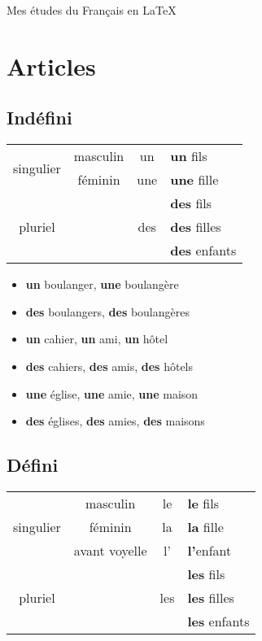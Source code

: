 \documentclass[12pt]{article}  %
\begin{document}
 

\newcommand{\bo}[1]{\textbf{#1}}
\newcommand{\rarrow}{\begin{math}\to\ \end{math}}


{\LARGE Mes études du Français en \LaTeX}

\section{Articles} 

\subsection{Indéfini}

\begin{tabular}{| c | c | c | l |}
  \hline                       
  \multirow{2}{*}{singulier} 
  	& masculin      & un & \bo{un} fils  \\ \cline{2-4}
  	& féminin       & une & \bo{une} fille \\ \cline{2-4}
  \multirow{3}{*}{pluriel} 
  	& & \multirow{3}{*}{des} & \bo{des} fils \\ \cline{4-4}
    & &  & \bo{des} filles \\ \cline{4-4}
    & &  & \bo{des} enfants \\
  \hline  
\end{tabular}

\begin{itemize}
  \item \bo{un} boulanger, \bo{une} boulangère 
  \item \bo{des} boulangers, \bo{des} boulangères
  \item \bo{un} cahier, \bo{un} ami, \bo{un} hôtel
  \item \bo{des} cahiers, \bo{des} amis, \bo{des} hôtels
  \item \bo{une} église, \bo{une} amie, \bo{une} maison
  \item \bo{des} églises, \bo{des} amies, \bo{des} maisons
\end{itemize}

\subsection{Défini}

\begin{tabular}{| c | c | c | l |}
  \hline                       
  \multirow{3}{*}{singulier} 
  	& masculin      & le & \bo{le} fils  \\ \cline{2-4}
  	& féminin       & la & \bo{la} fille \\ \cline{2-4}
  	& avant voyelle & l' & \bo{l'}enfant \\ \hline
  \multirow{3}{*}{pluriel} 
  	& & \multirow{3}{*}{les} & \bo{les} fils \\ \cline{4-4}
    & &  & \bo{les} filles \\ \cline{4-4}
    & &  & \bo{les} enfants \\
  \hline  
\end{tabular}
\end{document}
